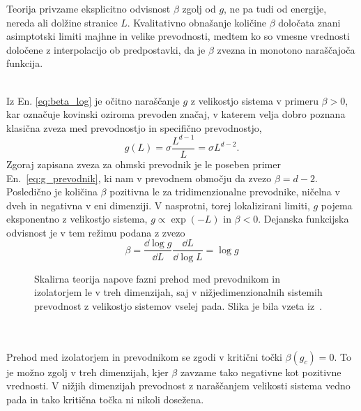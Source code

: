 Teorija privzame eksplicitno odvisnost $\beta$ zgolj od $g$, ne pa tudi od energije, nereda ali dolžine stranice $L$. Kvalitativno obnašanje količine $\beta$ določata znani asimptotski limiti majhne in velike prevodnosti, medtem ko so vmesne vrednosti določene z interpolacijo ob predpostavki, da je $\beta$ zvezna in monotono naraščajoča funkcija. \\\\
\begin{minipage}[t]{0.54\textwidth}
Iz En. \eqref{eq:beta_log} je očitno naraščanje $g$ z velikostjo sistema v primeru $\beta>0$, kar označuje kovinski oziroma prevoden značaj, v katerem velja dobro poznana klasična zveza med prevodnostjo in specifično prevodnostjo,
\begin{equation}\label{eq:g_prevodnik}
g(L)=\sigma\frac{L^{d-1}}{L}=\sigma L^{d-2}.
\end{equation}
Zgoraj zapisana zveza za ohmski prevodnik je le poseben primer En.~\eqref{eq:g_prevodnik}, ki nam v prevodnem območju da zvezo $\beta=d-2$. Posledično je količina $\beta$ pozitivna le za tridimenzionalne prevodnike, ničelna v dveh in negativna v eni dimenziji. V nasprotni, torej lokalizirani limiti, $g$ pojema eksponentno z velikostjo sistema, $g\propto \exp(-L)$ in $\beta<0$. Dejanska funkcijska odvisnost je v tem režimu podana z zvezo 
\begin{equation}
\beta=\frac{\dd \log g}{\dd L}\frac{\dd L}{\dd \log L}=\log g
\end{equation}
\end{minipage}\hfill
\begin{minipage}[t]{0.43\textwidth}
\begin{figure}[H]
\caption{Skalirna teorija napove fazni prehod med prevodnikom in izolatorjem le v treh dimenzijah, saj v nižjedimenzionalnih sistemih prevodnost z velikostjo sistemov vselej pada. Slika je bila vzeta iz~\cite{lagendijk2009fifty}.}
\label{fig:scalingtheory} 
\end{figure}
\end{minipage}\\\\
Prehod med izolatorjem in prevodnikom se zgodi v kritični točki $\beta(g_c)=0$. To je možno zgolj v treh dimenzijah, kjer $\beta$ zavzame tako negativne kot pozitivne vrednosti. V nižjih dimenzijah prevodnost z naraščanjem velikosti sistema vedno pada in tako kritična točka ni nikoli dosežena. 
